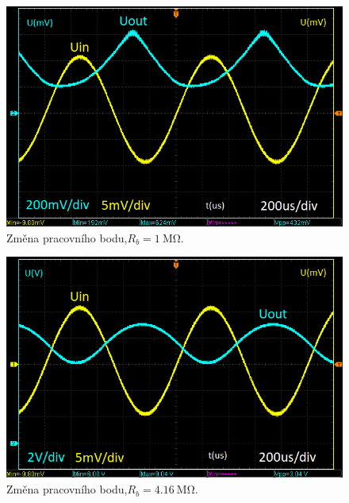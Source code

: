 \documentclass{protokol}
\begin{document}
	\begin{figure}[h!]
		\centering
		\includegraphics[width=\textwidth]{oscilo/4done.png}
		\centering
		\caption{Změna pracovního bodu,$ R_b=\SI{1}{\mega\ohm} $.}
		\label{fig:-osc_}
	\end{figure}
	
	\begin{figure}[h!]
		\centering
		\includegraphics[width=\textwidth]{oscilo/5done.png}
		\centering
		\caption{Změna pracovního bodu,$ R_b=\SI{4,16}{\mega\ohm} $.}
		\label{fig:-osc_}
	\end{figure}
\end{document}
